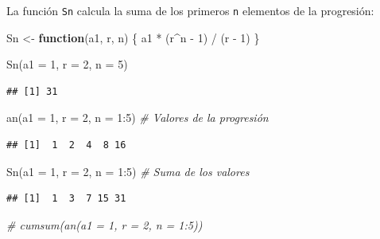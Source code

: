 \documentclass[
]{book}
\newenvironment{Shaded}{\begin{snugshade}}{\end{snugshade}}
\newcommand{\AttributeTok}[1]{\textcolor[rgb]{0.77,0.63,0.00}{#1}}
\newcommand{\CommentTok}[1]{\textcolor[rgb]{0.56,0.35,0.01}{\textit{#1}}}
\newcommand{\ControlFlowTok}[1]{\textcolor[rgb]{0.13,0.29,0.53}{\textbf{#1}}}
\newcommand{\DecValTok}[1]{\textcolor[rgb]{0.00,0.00,0.81}{#1}}
\newcommand{\FunctionTok}[1]{\textcolor[rgb]{0.00,0.00,0.00}{#1}}
\newcommand{\NormalTok}[1]{#1}
\newcommand{\OtherTok}[1]{\textcolor[rgb]{0.56,0.35,0.01}{#1}}
\newcommand{\SpecialCharTok}[1]{\textcolor[rgb]{0.00,0.00,0.00}{#1}}
\theoremstyle{break}
\begin{document}
La función \texttt{Sn} calcula la suma de los primeros \texttt{n}
elementos de la progresión:

\begin{Shaded}
\begin{Highlighting}[]
\NormalTok{Sn }\OtherTok{\textless{}{-}} \ControlFlowTok{function}\NormalTok{(a1, r, n) \{}
\NormalTok{        a1 }\SpecialCharTok{*}\NormalTok{ (r}\SpecialCharTok{\^{}}\NormalTok{n }\SpecialCharTok{{-}} \DecValTok{1}\NormalTok{) }\SpecialCharTok{/}\NormalTok{ (r }\SpecialCharTok{{-}} \DecValTok{1}\NormalTok{)}
\NormalTok{      \}}
  
\FunctionTok{Sn}\NormalTok{(}\AttributeTok{a1 =} \DecValTok{1}\NormalTok{, }\AttributeTok{r =} \DecValTok{2}\NormalTok{, }\AttributeTok{n =} \DecValTok{5}\NormalTok{)}
\end{Highlighting}
\end{Shaded}

\begin{verbatim}
## [1] 31
\end{verbatim}

\begin{Shaded}
\begin{Highlighting}[]
\FunctionTok{an}\NormalTok{(}\AttributeTok{a1 =} \DecValTok{1}\NormalTok{, }\AttributeTok{r =} \DecValTok{2}\NormalTok{, }\AttributeTok{n =} \DecValTok{1}\SpecialCharTok{:}\DecValTok{5}\NormalTok{)    }\CommentTok{\# Valores de la progresión}
\end{Highlighting}
\end{Shaded}

\begin{verbatim}
## [1]  1  2  4  8 16
\end{verbatim}

\begin{Shaded}
\begin{Highlighting}[]
\FunctionTok{Sn}\NormalTok{(}\AttributeTok{a1 =} \DecValTok{1}\NormalTok{, }\AttributeTok{r =} \DecValTok{2}\NormalTok{, }\AttributeTok{n =} \DecValTok{1}\SpecialCharTok{:}\DecValTok{5}\NormalTok{)    }\CommentTok{\# Suma de los valores}
\end{Highlighting}
\end{Shaded}

\begin{verbatim}
## [1]  1  3  7 15 31
\end{verbatim}

\begin{Shaded}
\begin{Highlighting}[]
\CommentTok{\# cumsum(an(a1 = 1, r = 2, n = 1:5))}
\end{Highlighting}
\end{Shaded}
\end{document}
